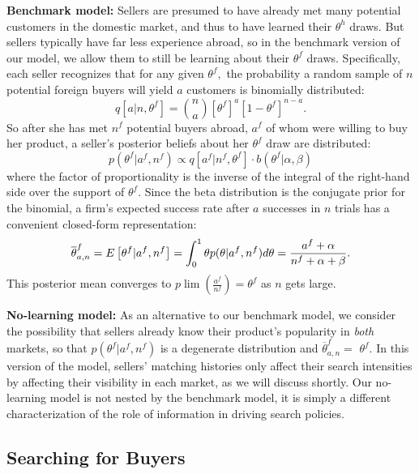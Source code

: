 \documentclass[12pt]{article}
\begin{document}
\textbf{Benchmark model:} Sellers are presumed to have already met many
potential customers in the domestic market, and thus to have learned their $%
\theta ^{h}$ draws. But sellers typically have far less experience abroad,
so in the benchmark version of our model, we allow them to still be learning
about their $\theta ^{f}$ draws. Specifically, each seller recognizes that
for any given $\theta ^{f},$ the probability a random sample of $n$
potential foreign buyers will yield $a$ customers is binomially distributed: 
\begin{equation*}
q\left[ a|n,\theta ^{f}\right] =\binom{n}{a}\left[ \theta ^{f}\right] ^{a}%
\left[ 1-\theta ^{f}\right] ^{n-a}.
\end{equation*}%
So after she has met $n^{f}$ potential buyers abroad, $a^{f}$ of whom were
willing to buy her product, a seller's posterior beliefs about her $\theta
^{f}$ draw are distributed:%
\begin{equation*}
p(\theta ^{f}|a^{f},n^{f})\propto q\left[ a^{f}|n^{f},\theta ^{f}\right]
\cdot b(\theta ^{f}|\alpha ,\beta )
\end{equation*}%
where the factor of proportionality is the inverse of the integral of the
right-hand side over the support of $\theta ^{f}$. Since the beta
distribution is the conjugate prior for the binomial, a firm's expected
success rate after $a$ successes in $n$ trials has a convenient closed-form
representation: 
\begin{equation}
\overline{\theta }_{a,n}^{f}=E\left[ \theta ^{f}|a^{f},n^{f}\right]
=\int_{0}^{1}\theta p(\theta |a^{f},n^{f})d\theta =\frac{a^{f}+\alpha }{%
n^{f}+\alpha +\beta }.  \label{success_probability}
\end{equation}%
This posterior mean converges to $p\lim \left( \frac{a^{f}}{n^{f}}\right)
=\theta ^{f}$ as $n$ gets large.

\textbf{No-learning model: }As an alternative to our benchmark model, we
consider the possibility that sellers already know their product's
popularity in \textit{both} markets, so that $p(\theta ^{f}|a^{f},n^{f})$ is
a degenerate distribution and $\overline{\theta }_{a,n}^{f}=$ $\theta ^{f}.$
In this version of the model, sellers' matching histories only affect their
search intensities by affecting their visibility in each market, as we will
discuss shortly. Our no-learning model is not nested by the benchmark model,
it is simply a different characterization of the role of information in
driving search policies.

\subsection{Searching for Buyers}
\end{document}
